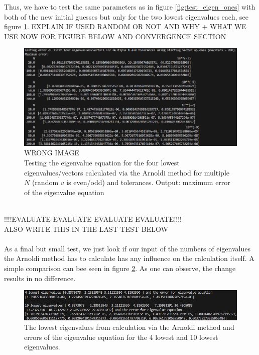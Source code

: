 \documentclass[11pt, letterpaper, onecolumn]{article}
\begin{document}
	Thus, we have to test the same parameters as in figure \ref{fig:test_eigen_ones} with both of the new initial guesses but only for the two lowest eigenvalues each, see figure \ref{fig:test_eigen_even-odd}. EXPLAIN IF USED RANDOM OR NOT AND WHY + WHAT WE USE NOW FOR FIGURE BELOW AND CONVERGENCE SECTION
	\begin{figure} [h] 
	\begin{center}	
	\includegraphics[width=19cm]{"test_eigen.png"}
	\caption{WRONG IMAGE\\
	Testing the eigenvalue equation for the four lowest eigenvalues/vectors calculated via the Arnoldi method for multiple $N$ (random $v$ is even/odd) and tolerances. Output: maximum error of the eigenvalue equation} \label{fig:test_eigen_even-odd}
	\end{center}
	\end{figure}
	\\
	!!!!EVALUATE EVALUATE EVALUATE EVALUATE!!!!\\
	ALSO WRITE THIS IN THE LAST TEST BELOW
	\\
	\\
	As a final but small test, we just look if our input of the numbers of eigenvalues the Arnoldi method has to calculate has any influence on the calculation itself. A simple comparison can bee seen in figure \ref{fig:test_eigen_number}. As one can observe, the change results in no difference.
	\begin{figure} [h] 
	\begin{center}	
	\includegraphics[width=19cm]{"test_eigen_numbers.png"}
	\caption{The lowest eigenvalues from calculation via the Arnoldi method and errors of the eigenvalue equation for the 4 lowest and 10 lowest eigenvalues.} \label{fig:test_eigen_number}
	\end{center}
	\end{figure}
\end{document}
